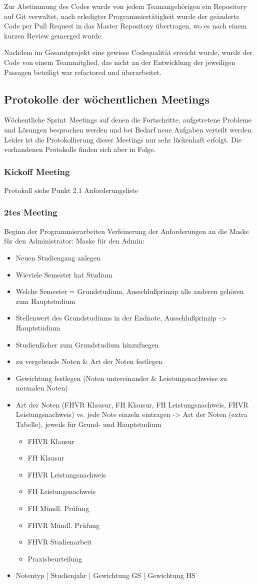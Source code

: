 \documentclass[12pt,a4paper,parskip]{scrreprt}
\begin{document}
Zur Abstimmung des Codes wurde von jedem Teamangehörigen ein Repository auf Git verwaltet, nach erledigter Programmiertätigkeit wurde der geänderte Code per Pull Request in das Master Repository übertragen, wo es nach einem kurzen Review gemerged wurde.

Nachdem im Gesamtprojekt eine gewisse Codequalität erreicht wurde, wurde der Code von einem Teammitglied, das nicht an der Entwicklung der jeweiligen Passagen beteiligt war refactored und überarbeitet.
\subsection{Protokolle der wöchentlichen Meetings}
Wöchentliche \glqq Sprint\grqq\ Meetings auf denen die Fortschritte, aufgetretene Probleme und Lösungen besprochen werden und bei Bedarf neue Aufgaben verteilt werden. Leider ist die Protokollierung dieser Meetings nur sehr lückenhaft erfolgt. Die vorhandenen Protokolle finden sich aber in Folge.
\subsubsection{Kickoff Meeting}
Protokoll siehe Punkt 2.1 Anforderungsliste
\subsubsection{2tes Meeting}
Beginn der Programmierarbeiten
Verfeinerung der Anforderungen an die Maske für den Administrator:
Maske für den Admin:
\begin{itemize}
	\item Neuen Studiengang anlegen
	\item Wieviele Semester hat Studium
	\item Welche Semester = Grundstudium, Ausschlußprinzip alle anderen gehören zum Hauptstudium
	\item Stellenwert des Grundstudiums in der Endnote, Ausschlußprinzip -> Hauptstudium
	\item Studienfächer zum Grundstudium hinzufuegen
	\item zu vergebende Noten \& Art der Noten festlegen
	\item Gewichtung festlegen (Noten untereinander \& Leistungsnachweise zu normalen Noten)
	\item Art der Noten (FHVR Klausur, FH Klausur, FH Leistungsnachweis, FHVR Leistungsnachweis) vs. jede Note einzeln eintragen
	-> Art der Noten (extra Tabelle), jeweils für Grund- und Hauptstudium
		\begin{itemize}
		\item FHVR Klausur
		\item FH Klausur
		\item FHVR Leistungsnachweis
		\item FH Leistungsnachweis
		\item FH Mündl. Prüfung
		\item FHVR Mündl. Prüfung
		\item FHVR Studienarbeit
		\item Praxisbeurteilung
		\end{itemize}
	\item Notentyp | Studienjahr | Gewichtung GS | Gewichtung HS
\end{itemize}
\end{document}
